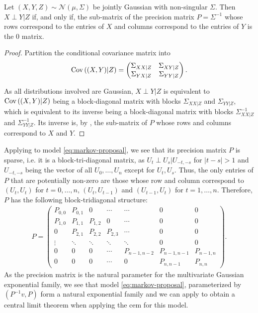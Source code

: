 \begin{lemma}
    \label{lem:gaussian_precision_zeros}
    Let $(X,Y,Z) \sim \mathcal N \left( \mu, \Sigma \right)$ be jointly Gaussian with non-singular $\Sigma$. Then $X \perp Y | Z$ if, and only if, the sub-matrix of the precision matrix $P = \Sigma^{-1}$ whose rows correspond to the entries of $X$ and columns correspond to the entries of $Y$ is the $0$ matrix.
\end{lemma}
\begin{proof}
    Partition the conditional covariance matrix into
    $$
    \operatorname{Cov} \left((X,Y) | Z\right) = \begin{pmatrix}
        \Sigma_{XX|Z} & \Sigma_{XY|Z} \\
        \Sigma_{YX|Z} & \Sigma_{YY|Z}
    \end{pmatrix}.
    $$

    As all distributions involved are Gaussian, $X \perp Y | Z$ is equivalent to $\operatorname{Cov} \left( (X,Y) |Z \right)$ being a block-diagonal matrix with blocks $\Sigma_{XX|Z}$ and $\Sigma_{YY|Z}$, which is equivalent to its inverse being a block-diagonal matrix with blocks $\Sigma_{XX|Z}^{-1}$ and $\Sigma_{YY|Z}^{-1}$. Its inverse is, by , the sub-matrix of $P$ whose rows and columns correspond to $X$ and $Y$. 
\end{proof}

Applying  to model \eqref{eq:markov-proposal}, we see that its precision matrix $P$ is sparse, i.e. it is a block-tri-diagonal matrix, as $U_{t} \perp U_{s} | U_{-t,-s}$ for $\lvert t - s\rvert > 1$ and $U_{-t,-s}$ being the vector of all $U_{0}, \dots, U_{n}$ except for $U_{t}, U_{s}$. Thus, the only entries of $P$ that are potentially non-zero are those whose row and column correspond to $(U_{t}, U_{t})$ for $t = 0, \dots, n$, $(U_{t}, U_{t - 1})$ and $(U_{t - 1}, U_{t})$ for $t=1, \dots, n$. 
Therefore, $P$ has the following block-tridiagonal structure:
\begin{align}
    \label{eq:P_structure}
P = \begin{pmatrix}
    P_{0,0} & P_{0, 1} & 0 & \cdots & \cdots & 0 & 0 \\
    P_{1, 0} & P_{1,1} & P_{1,2} & 0 & \cdots & 0 & 0\\
    0 & P_{2,1} & P_{2,2} & P_{2,3} & \cdots & 0 & 0 \\
    \vdots & \ddots & \ddots  & \ddots & \ddots & 0 & 0 \\
    0 & 0& 0& \cdots& P_{n - 1, n - 2}& P_{n - 1, n- 1} & P_{n - 1, n} \\
    0 & 0 & 0 & \cdots & 0 & P_{n, n - 1} & P_{n,n} 
\end{pmatrix}.
\end{align}
As the precision matrix is the natural parameter for the multivariate Gaussian exponential family, we see that model \eqref{eq:markov-proposal}, parameterized by $(P^{-1}v, P)$ form a natural exponential family and we can apply  to obtain a central limit theorem when applying the \acrshort{cem} for this model. 

